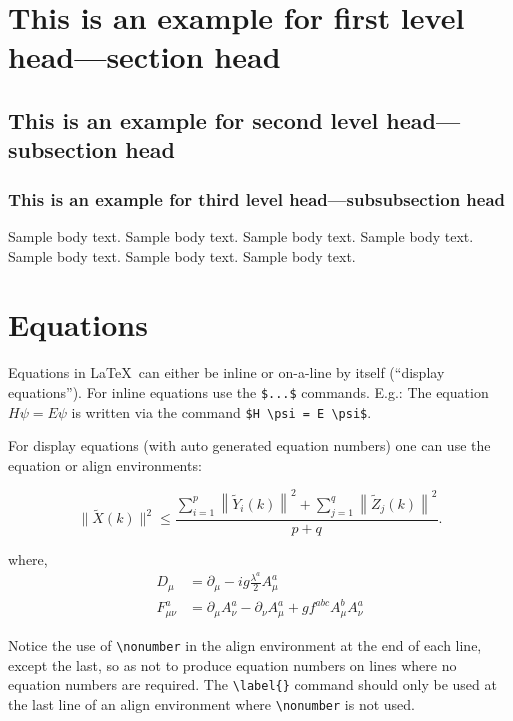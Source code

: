 \documentclass[sn-basic,lineno,pdflatex]{sn-jnl}
\theoremstyle{remark}
\theoremstyle{definition}
\begin{document}
\section{This is an example for first level head---section
head}\label{sec3}

\subsection{This is an example for second level head---subsection
head}\label{subsec2}

\subsubsection{This is an example for third level head---subsubsection
head}\label{subsubsec2}

Sample body text. Sample body text. Sample body text. Sample body text.
Sample body text. Sample body text. Sample body text.

\section{Equations}\label{sec4}

Equations in \LaTeX~can either be inline or on-a-line by itself
(``display equations''). For inline equations use the \texttt{\$...\$}
commands. E.g.: The equation \(H\psi = E \psi\) is written via the
command \texttt{\$H\ \textbackslash{}psi\ =\ E\ \textbackslash{}psi\$}.

For display equations (with auto generated equation numbers) one can use
the equation or align environments:

\begin{equation}
\|\tilde{X}(k)\|^2 \leq\frac{\sum\limits_{i=1}^{p}\left\|\tilde{Y}_i(k)\right\|^2+\sum\limits_{j=1}^{q}\left\|\tilde{Z}_j(k)\right\|^2 }{p+q}.\label{eq1}
\end{equation}

where, \begin{align}
D_\mu &=  \partial_\mu - ig \frac{\lambda^a}{2} A^a_\mu \nonumber \\
F^a_{\mu\nu} &= \partial_\mu A^a_\nu - \partial_\nu A^a_\mu + g f^{abc} A^b_\mu A^a_\nu \label{eq2}
\end{align}

Notice the use of \texttt{\textbackslash{}nonumber} in the align
environment at the end of each line, except the last, so as not to
produce equation numbers on lines where no equation numbers are
required. The \texttt{\textbackslash{}label\{\}} command should only be
used at the last line of an align environment where
\texttt{\textbackslash{}nonumber} is not used.
\end{document}
